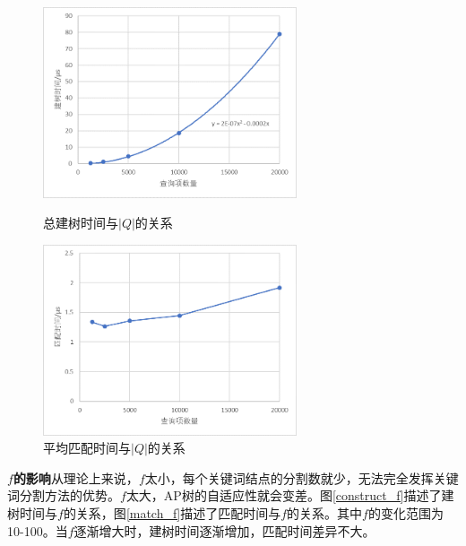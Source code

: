 \documentclass[UTF8]{ctexart}
\begin{document}
\begin{figure}[htbp]
    \centering
    \begin{minipage}[t]{8cm}
        \centering
        \includegraphics[width=7.5cm]{construct_nq.png}
        \caption{总建树时间与$|Q|$的关系}
        \label{construct_nq}
    \end{minipage}
    \begin{minipage}[t]{8cm}
        \centering
        \includegraphics[width=7.5cm]{match_nq.png}
        \caption{平均匹配时间与$|Q|$的关系}
        \label{match_nq}
    \end{minipage}
\end{figure}

\textbf{$f$的影响}\quad 从理论上来说，$f$太小，每个关键词结点的分割数就少，无法完全发挥关键词分割方法的优势。$f$太大，AP树的自适应性就会变差。图\ref{construct_f}描述了建树时间与$f$的关系，图\ref{match_f}描述了匹配时间与$f$的关系。其中$f$的变化范围为10-100。当$f$逐渐增大时，建树时间逐渐增加，匹配时间差异不大。
\end{document}
